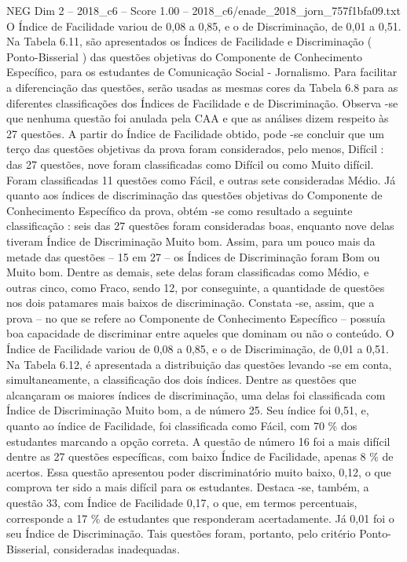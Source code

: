\begin{textsample}{NEG Dim 2 – 2018\_c6 – Score 1.00 – 2018\_c6/enade\_2018\_jorn\_757f1bfa09.txt}
O Índice de Facilidade variou de 0,08 a 0,85, e o de Discriminação, de 0,01 a 0,51.
Na Tabela 6.11, são apresentados os Índices de Facilidade e Discriminação ( Ponto-Bisserial ) das questões objetivas do Componente de Conhecimento Específico, para os estudantes de Comunicação Social - Jornalismo.
Para facilitar a diferenciação das questões, serão usadas as mesmas cores da Tabela 6.8 para as diferentes classificações dos Índices de Facilidade e de Discriminação.
Observa -se que nenhuma questão foi anulada pela CAA e que as análises dizem respeito às 27 questões.
A partir do Índice de Facilidade obtido, pode -se concluir que um terço das questões objetivas da prova foram considerados, pelo menos, Difícil : das 27 questões, nove foram classificadas como Difícil ou como Muito difícil.
Foram classificadas 11 questões como Fácil, e outras sete consideradas Médio.
Já quanto aos índices de discriminação das questões objetivas do Componente de Conhecimento Específico da prova, obtém -se como resultado a seguinte classificação : seis das 27 questões foram consideradas boas, enquanto nove delas tiveram Índice de Discriminação Muito bom.
Assim, para um pouco mais da metade das questões – 15 em 27 – os Índices de Discriminação foram Bom ou Muito bom.
Dentre as demais, sete delas foram classificadas como Médio, e outras cinco, como Fraco, sendo 12, por conseguinte, a quantidade de questões nos dois patamares mais baixos de discriminação.
Constata -se, assim, que a prova – no que se refere ao Componente de Conhecimento Específico – possuía boa capacidade de discriminar entre aqueles que dominam ou não o conteúdo.
O Índice de Facilidade variou de 0,08 a 0,85, e o de Discriminação, de 0,01 a 0,51.
Na Tabela 6.12, é apresentada a distribuição das questões levando -se em conta, simultaneamente, a classificação dos dois índices.
Dentre as questões que alcançaram os maiores índices de discriminação, uma delas foi classificada com Índice de Discriminação Muito bom, a de número 25.
Seu índice foi 0,51, e, quanto ao índice de Facilidade, foi classificada como Fácil, com 70 \% dos estudantes marcando a opção correta.
A questão de número 16 foi a mais difícil dentre as 27 questões específicas, com baixo Índice de Facilidade, apenas 8 \% de acertos.
Essa questão apresentou poder discriminatório muito baixo, 0,12, o que comprova ter sido a mais difícil para os estudantes.
Destaca -se, também, a questão 33, com Índice de Facilidade 0,17, o que, em termos percentuais, corresponde a 17 \% de estudantes que responderam acertadamente.
Já 0,01 foi o seu Índice de Discriminação.
Tais questões foram, portanto, pelo critério Ponto-Bisserial, consideradas inadequadas.

\end{textsample}
